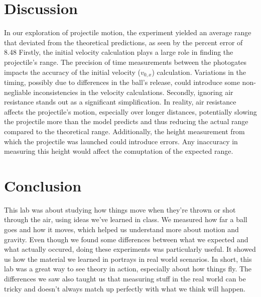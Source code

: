 \documentclass{report}
\begin{document}
    \section{Discussion}
    \bigbreak \noindent 
    In our exploration of projectile motion, the experiment yielded an average range that deviated from the theoretical predictions, as seen by the percent error of 8.48%
    \bigbreak \noindent 
    Firstly, the initial velocity calculation plays a large role in finding the projectile's range. The precision of time measurements between the photogates impacts the accuracy of the initial velocity ($v_{0,x}$) calculation. Variations in the timing, possibly due to differences in the ball's release, could introduce some non-negliable inconsistencies in the velocity calculations.
    \bigbreak \noindent 
    Secondly, ignoring air resistance stands out as a significant simplification. In reality, air resistance affects the projectile's motion, especially over longer distances, potentially slowing the projectile more than the model predicts and thus reducing the actual range compared to the theoretical range.
    \bigbreak \noindent 
    Additionally,  the height measurement from which the projectile was launched could introduce errors. Any inaccuracy in measuring this height would affect the comuptation of the expected range.

    \bigbreak \noindent 
    \section{Conclusion}
    \bigbreak \noindent 
    This lab was about studying how things move when they're thrown or shot through the air, using ideas we've learned in class. We measured how far a ball goes and how it moves, which helped us understand more about motion and gravity. Even though we found some differences between what we expected and what actually occured, doing these experiments was particularly useful. It showed us how the material we learned in portrays in real world scenarios.
    \bigbreak \noindent 
    In short, this lab was a great way to see theory in action, especially about how things fly. The differences we saw also taught us that measuring stuff in the real world can be tricky and doesn't always match up perfectly with what we think will happen.










    
\end{document}

